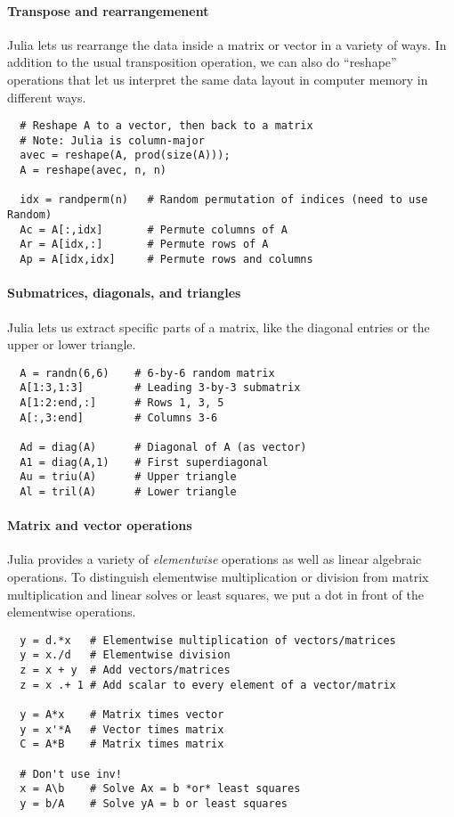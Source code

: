 \documentclass[12pt, leqno]{article}
\begin{document}
\paragraph{Transpose and rearrangemenent}
Julia lets us rearrange the data inside a matrix or vector in
a variety of ways.  In addition to the usual transposition
operation, we can also do ``reshape'' operations that let us
interpret the same data layout in computer memory in different ways.
\begin{lstlisting}
  # Reshape A to a vector, then back to a matrix
  # Note: Julia is column-major
  avec = reshape(A, prod(size(A)));
  A = reshape(avec, n, n)
  
  idx = randperm(n)   # Random permutation of indices (need to use Random)
  Ac = A[:,idx]       # Permute columns of A
  Ar = A[idx,:]       # Permute rows of A
  Ap = A[idx,idx]     # Permute rows and columns
\end{lstlisting}

\paragraph{Submatrices, diagonals, and triangles}
Julia lets us extract specific parts of a matrix, like the diagonal
entries or the upper or lower triangle.
\begin{lstlisting}
  A = randn(6,6)    # 6-by-6 random matrix
  A[1:3,1:3]        # Leading 3-by-3 submatrix
  A[1:2:end,:]      # Rows 1, 3, 5
  A[:,3:end]        # Columns 3-6
  
  Ad = diag(A)      # Diagonal of A (as vector)
  A1 = diag(A,1)    # First superdiagonal
  Au = triu(A)      # Upper triangle
  Al = tril(A)      # Lower triangle
\end{lstlisting}

\paragraph{Matrix and vector operations}
Julia provides a variety of {\em elementwise} operations as well as
linear algebraic operations.  To distinguish elementwise
multiplication or division from matrix multiplication and linear
solves or least squares, we put a dot in front of the elementwise
operations.
\begin{lstlisting}
  y = d.*x   # Elementwise multiplication of vectors/matrices
  y = x./d   # Elementwise division
  z = x + y  # Add vectors/matrices
  z = x .+ 1 # Add scalar to every element of a vector/matrix
  
  y = A*x    # Matrix times vector
  y = x'*A   # Vector times matrix
  C = A*B    # Matrix times matrix

  # Don't use inv!
  x = A\b    # Solve Ax = b *or* least squares
  y = b/A    # Solve yA = b or least squares
\end{lstlisting}
\end{document}
